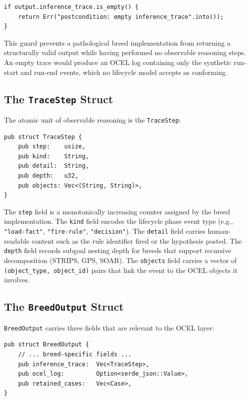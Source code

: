 \begin{verbatim}
if output.inference_trace.is_empty() {
    return Err("postcondition: empty inference_trace".into());
}
\end{verbatim}

This guard prevents a pathological breed implementation from returning a structurally valid output while having performed no observable reasoning steps. An empty trace would produce an OCEL log containing only the synthetic run-start and run-end events, which no lifecycle model accepts as conforming.

\subsection{The \texttt{TraceStep} Struct}

The atomic unit of observable reasoning is the \texttt{TraceStep}:

\begin{verbatim}
pub struct TraceStep {
    pub step:    usize,
    pub kind:    String,
    pub detail:  String,
    pub depth:   u32,
    pub objects: Vec<(String, String)>,
}
\end{verbatim}

The \texttt{step} field is a monotonically increasing counter assigned by the breed implementation. The \texttt{kind} field encodes the lifecycle phase event type (e.g., \texttt{"load-fact"}, \texttt{"fire-rule"}, \texttt{"decision"}). The \texttt{detail} field carries human-readable content such as the rule identifier fired or the hypothesis posted. The \texttt{depth} field records subgoal nesting depth for breeds that support recursive decomposition (STRIPS, GPS, SOAR). The \texttt{objects} field carries a vector of \texttt{(object\_type, object\_id)} pairs that link the event to the OCEL objects it involves.

\subsection{The \texttt{BreedOutput} Struct}

\texttt{BreedOutput} carries three fields that are relevant to the OCEL layer:

\begin{verbatim}
pub struct BreedOutput {
    // ... breed-specific fields ...
    pub inference_trace:  Vec<TraceStep>,
    pub ocel_log:         Option<serde_json::Value>,
    pub retained_cases:   Vec<Case>,
}
\end{verbatim}

